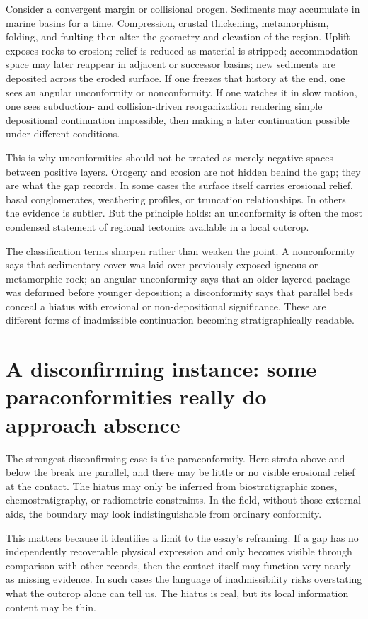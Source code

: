 \documentclass[11pt]{article}
\begin{document}
Consider a convergent margin or collisional orogen. Sediments may accumulate in marine basins for a time. Compression, crustal thickening, metamorphism, folding, and faulting then alter the geometry and elevation of the region. Uplift exposes rocks to erosion; relief is reduced as material is stripped; accommodation space may later reappear in adjacent or successor basins; new sediments are deposited across the eroded surface. If one freezes that history at the end, one sees an angular unconformity or nonconformity. If one watches it in slow motion, one sees subduction- and collision-driven reorganization rendering simple depositional continuation impossible, then making a later continuation possible under different conditions.

This is why unconformities should not be treated as merely negative spaces between positive layers. Orogeny and erosion are not hidden behind the gap; they are what the gap records. In some cases the surface itself carries erosional relief, basal conglomerates, weathering profiles, or truncation relationships. In others the evidence is subtler. But the principle holds: an unconformity is often the most condensed statement of regional tectonics available in a local outcrop.

The classification terms sharpen rather than weaken the point. A nonconformity says that sedimentary cover was laid over previously exposed igneous or metamorphic rock; an angular unconformity says that an older layered package was deformed before younger deposition; a disconformity says that parallel beds conceal a hiatus with erosional or non-depositional significance. These are different forms of inadmissible continuation becoming stratigraphically readable.

\section{A disconfirming instance: some paraconformities really do approach absence}
The strongest disconfirming case is the paraconformity. Here strata above and below the break are parallel, and there may be little or no visible erosional relief at the contact. The hiatus may only be inferred from biostratigraphic zones, chemostratigraphy, or radiometric constraints. In the field, without those external aids, the boundary may look indistinguishable from ordinary conformity.

This matters because it identifies a limit to the essay's reframing. If a gap has no independently recoverable physical expression and only becomes visible through comparison with other records, then the contact itself may function very nearly as missing evidence. In such cases the language of inadmissibility risks overstating what the outcrop alone can tell us. The hiatus is real, but its local information content may be thin.
\end{document}
